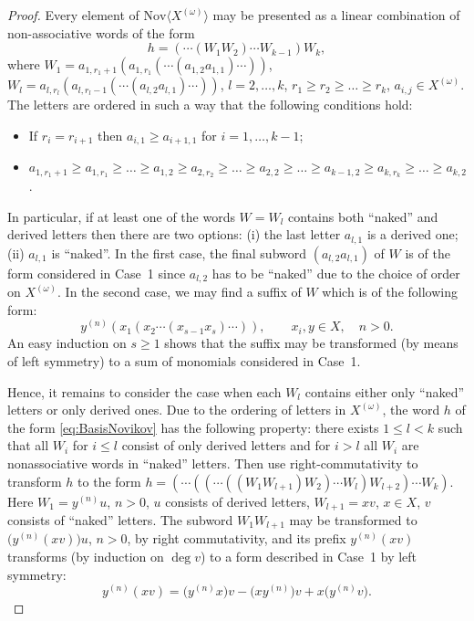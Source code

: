 \documentclass[pdftex]{sigma}
\numberwithin{equation}{section}
\def\Nov{\mathrm{Nov}}
\begin{document}
\begin{proof}
Every element of $\Nov\bigl\langle X^{(\omega)}\bigr\rangle$
may be presented as a linear combination of non-associative words
of the form
\begin{equation}\label{eq:BasisNovikov}
h=(\cdots (W_1W_2) \cdots W_{k-1})W_k,
\end{equation}
where
$W_1 = a_{1,r_1+1}(a_{1,r_1}(\cdots (a_{1,2}a_{1,1})\cdots ))$,
$W_l = a_{l,r_l}(a_{l,r_l-1}(\cdots (a_{l,2}a_{l,1})\cdots ))$,
$l=2,\dots, k$,
$r_1\ge r_2\ge \dots \ge r_k$,
$a_{i,j} \in X^{(\omega )}$.
The letters are ordered in such a way that the following conditions hold:
\begin{itemize}\itemsep=0pt
\item If $r_i=r_{i+1}$ then $a_{i,1}\ge a_{i+1,1}$ for $i=1,\dots, k-1$;
\item
$a_{1,r_1+1}\ge a_{1,r_1}\ge \dots \ge a_{1,2}\ge a_{2,r_2}\ge \dots \ge a_{2,2}\ge \dots \ge a_{k-1,2}\ge a_{k,r_k}\ge \dots \ge a_{k,2}$.
\end{itemize}

In particular, if at least one of the words $W=W_l$ contains both ``naked'' and derived letters then there are two options:
(i) the last letter $a_{l,1}$ is a derived one; (ii) $a_{l,1}$ is ``naked''.
In the first case, the final subword $(a_{l,2}a_{l,1})$ of $W$ is of the form considered in Case~1 since $a_{l,2}$ has to be ``naked'' due to the choice of order on $X^{(\omega )}$. In the second case, we may find a suffix of $W$ which is of the following form:
\[
y^{(n)}(x_1(x_2\cdots (x_{s-1}x_s)\cdots )),\qquad x_i,y\in X,\quad n>0.
\]
An easy induction on $s\ge 1$ shows that the suffix may be transformed (by means of left symmetry) to a sum of monomials
considered in Case~1.

Hence, it remains to consider the case when each $W_l$ contains
either only ``naked'' letters or only derived ones.
Due to the ordering of letters in $X^{(\omega )}$,
the word $h$ of the form \eqref{eq:BasisNovikov}
has the following property:
there exists $1\le l<k$ such that all $W_i$ for $i\le l$ consist of only derived letters and for $i>l$ all $W_i$ are nonassociative words in ``naked'' letters.
Then use right-commutativity to transform $h$ to the form
$h =
(\cdots ((\cdots ((W_1W_{l+1})W_2)\cdots W_{l})W_{l+2}) \cdots W_k)$.
Here $W_1 = y^{(n)}u$, $n>0$, $u$ consists of derived letters,
$W_{l+1} = xv$, $x\in X$, $v$ consists of ``naked'' letters. The subword $W_1W_{l+1}$ may be transformed to
$\bigl(y^{(n)}(xv)\bigr)u$, $n>0$, by right commutativity, and its prefix
$y^{(n)}(xv)$ transforms (by induction on $\deg v$) to a form described in Case~1 by left symmetry:
\[
y^{(n)}(xv) = \bigl(y^{(n)}x\bigr)v - \bigl(xy^{(n)}\bigr)v + x\bigl(y^{(n)}v\bigr).
\tag*{\qed}
\]
\renewcommand{\qed}{}
\end{proof}
\end{document}
